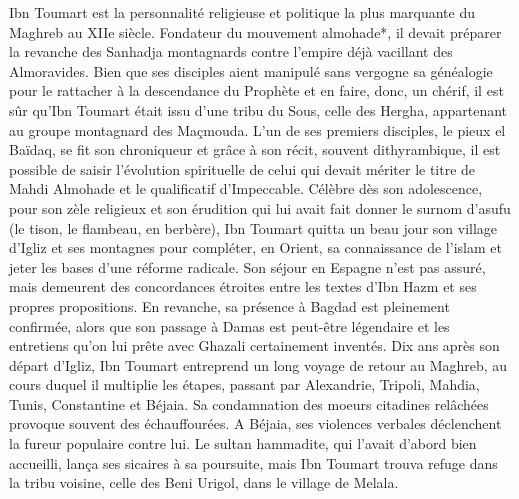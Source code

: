 Ibn Toumart est la personnalité religieuse et politique la plus marquante du Maghreb au
XIIe siècle. Fondateur du mouvement almohade*, il devait préparer la revanche des Sanhadja
montagnards contre l’empire déjà vacillant des Almoravides. Bien que ses disciples aient
manipulé sans vergogne sa généalogie pour le rattacher à la descendance du Prophète et en
faire, donc, un chérif, il est sûr qu’Ibn Toumart était issu d’une tribu du Sous, celle des Hergha,
appartenant au groupe montagnard des Maçmouda.
 L’un de ses premiers disciples, le pieux el Baïdaq, se fit son chroniqueur et grâce à son
récit, souvent dithyrambique, il est possible de saisir l’évolution spirituelle de celui qui
devait mériter le titre de Mahdi Almohade et le qualificatif d’Impeccable. Célèbre dès son
adolescence, pour son zèle religieux et son érudition qui lui avait fait donner le surnom d’asufu
(le tison, le flambeau, en berbère), Ibn Toumart quitta un beau jour son village d’Igliz et
ses montagnes pour compléter, en Orient, sa connaissance de l’islam et jeter les bases d’une
réforme radicale.
 Son séjour en Espagne n’est pas assuré, mais demeurent des concordances étroites entre
les textes d’Ibn Hazm et ses propres propositions. En revanche, sa présence à Bagdad est
pleinement confirmée, alors que son passage à Damas est peut-être légendaire et les entretiens
qu’on lui prête avec Ghazali certainement inventés.
 Dix ans après son départ d’Igliz, Ibn Toumart entreprend un long voyage de retour au Maghreb,
au cours duquel il multiplie les étapes, passant par Alexandrie, Tripoli, Mahdia, Tunis,
Constantine et Béjaia. Sa condamnation des moeurs citadines relâchées provoque souvent des
échauffourées. A Béjaia, ses violences verbales déclenchent la fureur populaire contre lui. Le
sultan hammadite, qui l’avait d’abord bien accueilli, lança ses sicaires à sa poursuite, mais Ibn
Toumart trouva refuge dans la tribu voisine, celle des Beni Urigol, dans le village de Melala.
